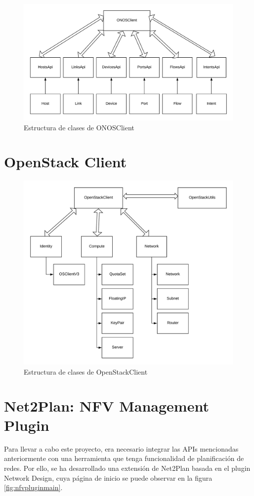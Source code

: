 \begin{figure}[!ht]
	\centering
	\includegraphics[width=0.8\linewidth]{imagenes/ONOSClient}
	\caption{Estructura de clases de ONOSClient}
	\label{fig:onosclient}
\end{figure}


\section{OpenStack Client}
\label{sec:openstackclient}

\begin{figure}[!ht]
	\centering
	\includegraphics[width=0.8\linewidth]{imagenes/OpenStackClient}
	\caption{Estructura de clases de OpenStackClient}
	\label{fig:openstackclient}
\end{figure}

\section{Net2Plan: NFV Management Plugin}
\label{sec:nfvplugin}

Para llevar a cabo este proyecto, era necesario integrar las APIs mencionadas anteriormente con una herramienta que tenga funcionalidad de planificación de redes. Por ello, se ha desarrollado una extensión de Net2Plan basada en el plugin Network Design, cuya página de inicio se puede observar en la figura \ref{fig:nfvpluginmain}.


